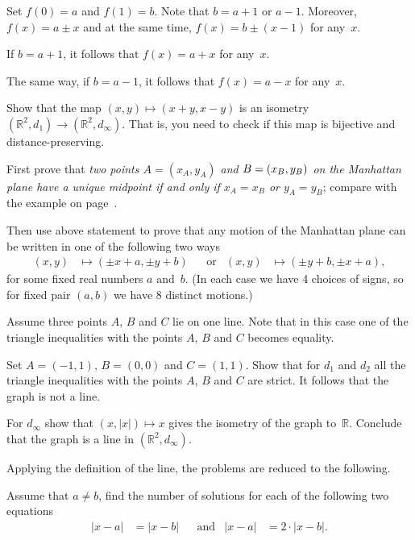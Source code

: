 Set $f(0)=a$ and $f(1)=b$.
Note that $b=a+1$ or $a-1$.
Moreover, $f(x)=a\pm x$ and at the same time, $f(x)=b\pm(x-1)$ for any~$x$.

If $b=a+1$, 
it follows that 
$f(x)=a+x$  for any~$x$.

The same way, if $b=a-1$, 
it follows that 
$f(x)=a-x$  for any~$x$.

Show that the map $(x,y)\mapsto (x+y,x-y)$ is an isometry   $(\mathbb{R}^2,d_1)\to (\mathbb{R}^2,d_\infty)$.
That is, you need to check if this map is bijective and distance-preserving.

First prove that \textit{two points $A=(x_A,y_A)$ and $B\z=(x_B,y_B)$ on the Manhattan plane have a unique midpoint if and only if $x_A=x_B$ or $y_A=y_B$}; compare with the example on page~\pageref{example:isometric but not congruent}. 

Then use above statement to prove that
any motion of the Manhattan plane 
can be written in one of the following two ways
\begin{align*}
(x,y)&\mapsto (\pm x+a,\pm y+b)
&&\text{or} 
&(x,y)&\mapsto (\pm y+b,\pm x+a),
\end{align*}
for some fixed real numbers $a$ and~$b$.
(In each case we have 4 choices of signs, so for fixed pair $(a,b)$ we have 8 distinct motions.)

Assume three points $A$, $B$ and $C$ lie on one line.
Note that in this case one of the triangle inequalities with the points $A$, $B$ and $C$ becomes equality.

Set $A=(-1,1)$, $B=(0,0)$ and $C=(1,1)$.
Show that for $d_1$ and $d_2$
all the triangle inequalities with the points $A$, $B$ and $C$ are strict.
It follows that the graph is not a line.

For $d_\infty$ show that $(x,|x|)\mapsto x$ gives the isometry of the graph to~$\mathbb{R}$.
Conclude that the graph is a line in $(\mathbb{R}^2,d_\infty)$.



Applying the definition of the line,
the problems are reduced to the following.

Assume that $a\ne b$,
find the number of solutions for each of the following two equations
\begin{align*}
|x-a|&=|x-b|
&&\text{and}
&|x-a|&=2\cdot |x-b|.
\end{align*}


